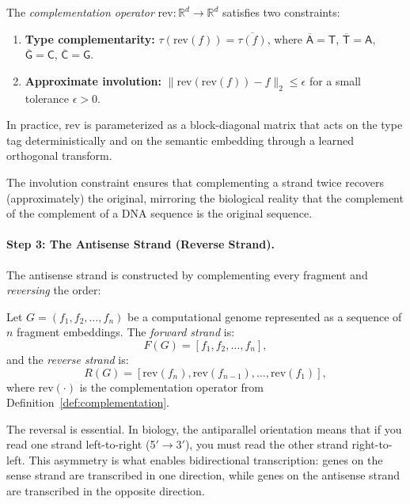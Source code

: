 \begin{definition}
\label{def:complementation}
The \emph{complementation operator} $\mathrm{rev}: \mathbb{R}^d \to \mathbb{R}^d$ satisfies two constraints:
\begin{enumerate}[leftmargin=1.5em]
  \item \textbf{Type complementarity:} $\tau(\mathrm{rev}(f)) = \overline{\tau(f)}$, where $\overline{\mathsf{A}} = \mathsf{T}$, $\overline{\mathsf{T}} = \mathsf{A}$, $\overline{\mathsf{G}} = \mathsf{C}$, $\overline{\mathsf{C}} = \mathsf{G}$.
  \item \textbf{Approximate involution:} $\|\mathrm{rev}(\mathrm{rev}(f)) - f\|_2 \leq \epsilon$ for a small tolerance $\epsilon > 0$.
\end{enumerate}
In practice, $\mathrm{rev}$ is parameterized as a block-diagonal matrix that acts on the type tag deterministically and on the semantic embedding through a learned orthogonal transform.
\end{definition}

The involution constraint ensures that complementing a strand twice recovers (approximately) the original, mirroring the biological reality that the complement of the complement of a DNA sequence is the original sequence.

\paragraph{Step 3: The Antisense Strand (Reverse Strand).}
The antisense strand is constructed by complementing every fragment and \emph{reversing} the order:

\begin{definition}
\label{def:strands}
Let $G = (f_1, f_2, \ldots, f_n)$ be a computational genome represented as a sequence of $n$ fragment embeddings. The \emph{forward strand} is:
\begin{equation}
F(G) = [f_1, f_2, \ldots, f_n],
\end{equation}
and the \emph{reverse strand} is:
\begin{equation}
R(G) = [\mathrm{rev}(f_n), \mathrm{rev}(f_{n-1}), \ldots, \mathrm{rev}(f_1)],
\end{equation}
where $\mathrm{rev}(\cdot)$ is the complementation operator from Definition~\ref{def:complementation}.
\end{definition}

The reversal is essential. In biology, the antiparallel orientation means that if you read one strand left-to-right (5\('\to\)3\('\)), you must read the other strand right-to-left. This asymmetry is what enables bidirectional transcription: genes on the sense strand are transcribed in one direction, while genes on the antisense strand are transcribed in the opposite direction.

